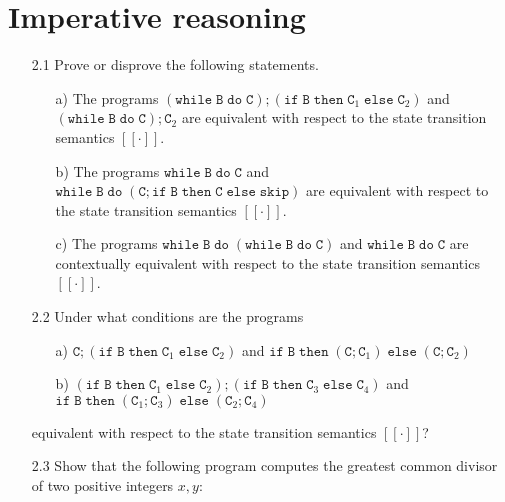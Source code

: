 \documentclass{article}
\newcommand{\B}{\mathtt{B}}
\newcommand{\C}{\mathtt{C}}
\newcommand{\ifsym}{\mathtt{if}}
\newcommand{\then}{\mathtt{then}}
\newcommand{\elsesym}{\mathtt{else}}
\newcommand{\whilesym}{\mathtt{while}}
\newcommand{\dosym}{\mathtt{do}}
\newcommand{\skipsym}{\mathtt{skip}}
\newcommand{\question}[1]
{\color{DarkBlue}#1 \color{Black}}
\begin{document}

\section{Imperative reasoning}
\begin{enumerate}

\question{
\item[2.1] Prove or disprove the following statements.
\begin{enumerate}
\item[a)] The programs $(\whilesym\; \B \; \dosym \; \C); (\ifsym \; \B \; \then \; \C_1 \; \elsesym \; \C_2)$ and $(\whilesym \; \B \; \dosym \; \C);\C_2$
are equivalent with respect to the state transition semantics $[[\cdot]]$.

\item[b)] The programs $\whilesym\; \B \; \dosym \; \C$ and $\whilesym \; \B \; \dosym \; (\C;\ifsym \; \B \; \then \; \C \; \elsesym \; \skipsym)$ are 
equivalent with respect to the state transition semantics $[[\cdot]]$.

\item[c)] The programs $\whilesym\; \B \; \dosym \; (\whilesym \; \B \; \dosym \; \C)$ and $\whilesym\; \B \; \dosym \; \C$ are 
contextually equivalent with respect to the state transition semantics $[[\cdot]]$.
\end{enumerate}
}

\question{
\item[2.2] Under what conditions are the programs
\begin{enumerate} 

\item[a)] $\C;(\ifsym \; \B \; \then\; \C_1\; \elsesym \; \C_2)$ and $\ifsym \; \B \; \then\; (\C; \C_1) \; \elsesym \; (\C; \C_2)$
\item[b)] $(\ifsym \; \B \; \then\; \C_1 \; \elsesym \; \C_2); (\ifsym \; \B \; \then \; \C_3 \; \elsesym \; \C_4)$ and $\ifsym \; \B \; \then\; (\C_1;\C_3) \; \elsesym \; (\C_2;\C_4)$
\end{enumerate}

equivalent with respect to the state transition semantics $[[\cdot]]$?
}

\question{
\item[2.3] Show that the following program computes the greatest common divisor of two positive integers $x,y$:

}
\end{enumerate}
\end{document}
